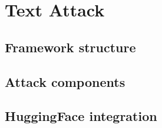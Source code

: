 \section{Text Attack}\label{sec:text-attack}

\subsection{Framework structure}\label{subsec:framework-structure}

\subsection{Attack components}\label{subsec:attack-components}

\subsection{HuggingFace integration}\label{subsec:huggingface-integration}
